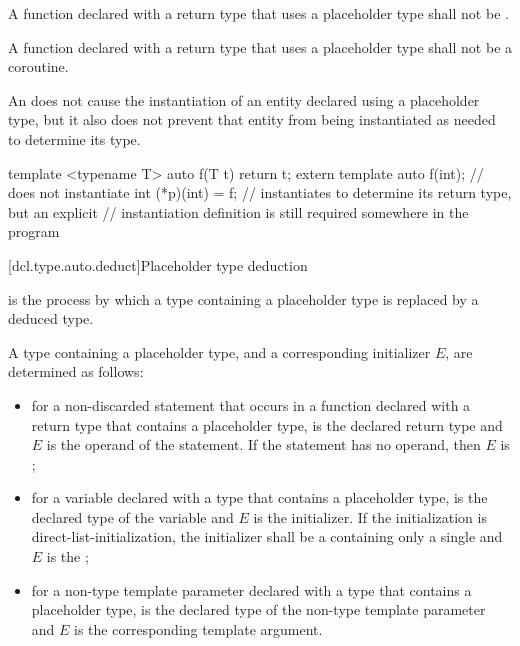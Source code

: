 \pnum
A function declared with a return type that uses a placeholder type shall not
be .

\pnum
A function declared with a return type that uses a placeholder type shall not
be a coroutine.

\pnum
An  does not cause the
instantiation of an entity declared using a placeholder type, but it also does
not prevent that entity from being instantiated as needed to determine its
type.
\begin{example}
\begin{codeblock}
template <typename T> auto f(T t) { return t; }
extern template auto f(int);    // does not instantiate 
int (*p)(int) = f;              // instantiates  to determine its return type, but an explicit
                                // instantiation definition is still required somewhere in the program
\end{codeblock}
\end{example}

[dcl.type.auto.deduct]{Placeholder type deduction}
%

\pnum
{}
is the process by which
a type containing a placeholder type
is replaced by a deduced type.

\pnum
A type  containing a placeholder type,
and a corresponding initializer $E$,
are determined as follows:
\begin{itemize}
\item
for a non-discarded  statement that occurs
in a function declared with a return type
that contains a placeholder type,
 is the declared return type
and $E$ is the operand of the  statement.
If the  statement
has no operand,
then $E$ is ;
\item
for a variable declared with a type
that contains a placeholder type,
 is the declared type of the variable
and $E$ is the initializer.
If the initialization is direct-list-initialization,
the initializer shall be a 
containing only a single 
and $E$ is the ;
\item
for a non-type template parameter declared with a type
that contains a placeholder type,
 is the declared type of the non-type template parameter
and $E$ is the corresponding template argument.
\end{itemize}

